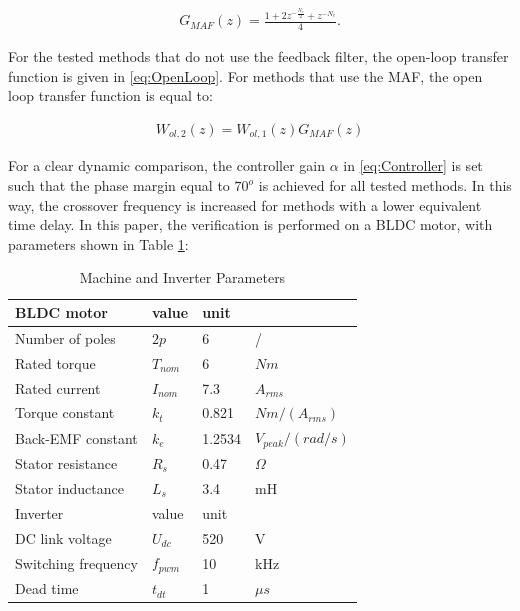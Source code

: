 \documentclass[journal]{IEEEtran}
\begin{document}
\begin{equation}
\begin{aligned}
G_{MAF}(z) = \frac{1 + 2z^{-\frac{N_c}{2}} + z^{-N_c}}{4}.
\label{eq:MAF} 
\end{aligned}    
\end{equation}

For the tested methods that do not use the feedback filter, the open-loop transfer function is given in \eqref{eq:OpenLoop}. For methods that use the MAF, the open loop transfer function is equal to:

\begin{equation}
\begin{aligned}
W_{ol,2}(z) = W_{ol,1}(z) G_{MAF}(z)
\label{eq:OpenLoop_MAF} 
\end{aligned}    
\end{equation}

For a clear dynamic comparison, the controller gain $\alpha$ in \eqref{eq:Controller} is set such that the phase margin equal to $70^o$ is achieved for all tested methods. In this way, the crossover frequency is increased for methods with a lower equivalent time delay. 
In this paper, the verification is performed on a BLDC motor, with parameters shown in Table \ref{tab:motor_param}:

\begin{table}[h!]
			  \caption{Machine and Inverter Parameters}
              \label{tab:motor_param}
              \centering
              \begin{tabular}{llll}
                           \midrule\midrule
        BLDC motor & value   & unit\\
        \midrule               
                  Number of poles	& $2p$ & 6 & /\\
                  Rated torque  & $T_{nom}$ & 6 &  $Nm$  \\
                  Rated current  & $I_{nom}$ & 7.3 &  $A_{rms}$  \\
                  Torque constant  & $k_{t}$ & 0.821 & $Nm/(A_{rms})$   \\
                  Back-EMF constant  & $k_{e}$ & 1.2534 & $V_{peak}/(rad/s)$   \\
                  Stator resistance  & $R_{s}$ & 0.47 & $\Omega$   \\
                  Stator inductance  & $L_{s}$ & 3.4 & mH   \\
                  \midrule\midrule

        Inverter & value   & unit\\
        \midrule               
                  DC link voltage	& $U_{dc}$ & 520 & V \\  
                  Switching frequency  & $f_{pwm}$ & 10 & kHz   \\
                  Dead time  & $t_{dt}$ & 1 &  $\mu s$  \\
                  \midrule\midrule
                                                        
              \end{tabular}
\end{table}
\end{document}
